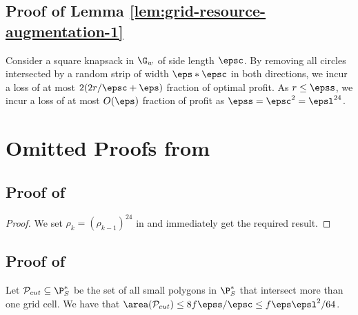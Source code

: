 \subsection{Proof of Lemma \ref{lem:grid-resource-augmentation-1}}
%
	Consider a square knapsack in $\G_{w}$ of side length $\epsc$.
	By removing  all circles intersected by a random strip of width $\eps*\epsc$ in both directions, we incur a loss of at most $2(2 r/\epsc + \eps)$ fraction of optimal profit. As $r\le \epss$, we incur a loss of at most $O(\eps)$ fraction of profit as $\epss = \epsc^2 = \epsl^{24}$.




\section{Omitted Proofs from }

\subsection{Proof of }
\begin{proof}We set $\rho_k=(\rho_{k-1})^{24}$ in  and immediately get the required result.
\end{proof}

\subsection{Proof of }

\begin{lem}
	\label{lem: cut-polygon}
	Let $\mathcal{P}_{cut}\subseteq \P_{S}^{*}$ be the set of all small polygons in $\P_{S}^{*}$ that intersect more than one grid cell. We have that $\area(\mathcal{P}_{cut}) \le 8 f \epss/\epsc \le f \eps \epsl^2/64$.
\end{lem}

